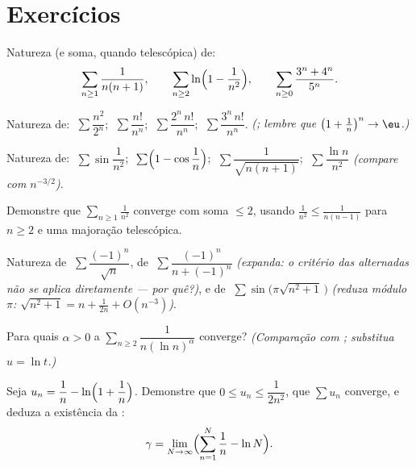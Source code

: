 \section{Exercícios}

\begin{exercise}[$\star$]\label{exo:b1:series:1}
Natureza (e soma, quando telescópica) de:
\[
\sum_{n\geq1} \frac{1}{n(n+1)},
\qquad
\sum_{n\geq2} \ln\Bigl(1 - \frac{1}{n^2}\Bigr),
\qquad
\sum_{n\geq0} \frac{3^n + 4^n}{5^n} .
\]
\end{exercise}

\begin{exercise}[$\star$]\label{exo:b1:series:2}
Natureza de: $\;\sum \dfrac{n^2}{2^n}$; $\;\sum \dfrac{n!}{n^n}$;
$\;\sum \dfrac{2^n\,n!}{n^n}$; $\;\sum \dfrac{3^n\,n!}{n^n}$.
\emph{(; lembre que $\bigl(1 + \frac1n\bigr)^n \to \eu$.)}
\end{exercise}

\begin{exercise}[$\star$]\label{exo:b1:series:3}
Natureza de: $\;\sum \sin\dfrac{1}{n^2}$; $\;\sum
\Bigl(1 - \cos\dfrac1n\Bigr)$; $\;\sum \dfrac{1}{\sqrt{n(n+1)}}$;
$\;\sum \dfrac{\ln n}{n^2}$ \emph{(compare com $n^{-3/2}$)}.
\end{exercise}

\begin{exercise}[$\star$]\label{exo:b1:series:4}
Demonstre que $\sum_{n\geq1} \frac{1}{n^2}$ converge com soma $\leq 2$,
usando $\frac{1}{n^2} \leq \frac{1}{n(n-1)}$ para $n \geq 2$ e uma majoração
telescópica.
\end{exercise}

\begin{exercise}[$\star\star$]\label{exo:b1:series:5}
Natureza de $\;\sum \dfrac{(-1)^n}{\sqrt n}$, de $\;\sum
\dfrac{(-1)^n}{n + (-1)^n}$ \emph{(expanda: o critério das
alternadas não se aplica diretamente --- por quê?)}, e de $\;\sum
\sin\bigl(\pi\sqrt{n^2+1}\,\bigr)$
\emph{(reduza módulo $\pi$: $\sqrt{n^2+1} = n + \frac{1}{2n} + O(n^{-3})$)}.
\end{exercise}

\begin{exercise}[$\star\star$]\label{exo:b1:series:6}
Para quais $\alpha > 0$ a  $\sum_{n \geq 2}
\dfrac{1}{n (\ln n)^{\alpha}}$ converge? \emph{(Comparação com
; substitua $u = \ln t$.)}
\end{exercise}

\begin{exercise}[$\star\star$]\label{exo:b1:series:7}
Seja $u_n = \dfrac{1}{n} - \ln\Bigl(1 + \dfrac1n\Bigr)$. Demonstre que
$0 \leq u_n \leq \dfrac{1}{2n^2}$, que $\sum u_n$ converge, e
deduza a existência da :
\[
\gamma = \lim_{N \to \infty} \Bigl( \sum_{n=1}^{N} \frac 1n - \ln N
\Bigr) .
\]
\end{exercise}

